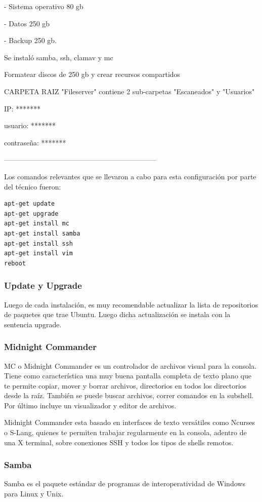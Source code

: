 \documentclass[12pt,a4paper]{article}
\begin{document}
- Sistema operativo 80 gb 

- Datos 250 gb 

- Backup 250 gb.

Se instaló samba, ssh, clamav y mc

Formatear discos de 250 gb y crear recursos compartidos 

CARPETA RAIZ "Fileserver" contiene 2 sub-carpetas "Escaneados" y "Usuarios"

IP: *******

usuario: *******

contraseña: *******

\begin{center}
-----------------------------------------------------------------
\end{center}

Los comandos relevantes que se llevaron a cabo para esta configuración por parte del técnico fueron:

\begin{lstlisting}
apt-get update
apt-get upgrade
apt-get install mc
apt-get install samba
apt-get install ssh
apt-get install vim
reboot 
\end{lstlisting}

\subsubsection{Update y Upgrade}
Luego de cada instalación, es muy recomendable actualizar la lista de repositorios de paquetes que trae Ubuntu. Luego dicha actualización se instala con la sentencia upgrade.

\subsubsection{Midnight Commander}
MC o Midnight Commander es un controlador de archivos visual para la consola. Tiene como característica una muy buena pantalla completa de texto plano que te permite copiar, mover y borrar archivos, directorios en todos los directorios desde la raíz. También se puede buscar archivos, correr comandos en la subshell. Por último incluye un visualizador y editor de archivos.

Midnight Commander esta basado en interfaces de texto versátiles como Ncurses o S-Lang, quienes te permiten trabajar regularmente en la consola, adentro de una X terminal, sobre conexiones SSH y todos los tipos de shells remotos.\cite{MC}

\subsubsection{Samba}
Samba es el paquete estándar de programas de interoperatividad de Windows para Linux y Unix.
\end{document}
